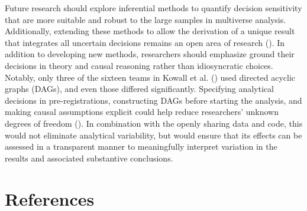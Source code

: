 \documentclass[
  man,
  floatsintext,
  longtable,
  nolmodern,
  notxfonts,
  notimes,
  colorlinks=true,linkcolor=blue,citecolor=blue,urlcolor=blue]{apa7}
\begin{document}
Future research should explore inferential methods to quantify decision
sensitivity that are more suitable and robust to the large samples in
multiverse analysis. Additionally, extending these methods to allow the
derivation of a unique result that integrates all uncertain decisions
remains an open area of research
(). In
addition to developing new methods, researchers should emphasize ground
their decisions in theory and causal reasoning rather than idiosyncratic
choices. Notably, only three of the sixteen teams in Kowall et al.
() used directed acyclic graphs
(DAGs), and even those differed significantly. Specifying analytical
decisions in pre-registrations, constructing DAGs before starting the
analysis, and making causal assumptions explicit could help reduce
researchers' unknown degrees of freedom
(). In combination with the openly sharing data and code, this would
not eliminate analytical variability, but would ensure that its effects
can be assessed in a transparent manner to meaningfully interpret
variation in the results and associated substantive conclusions.

\newpage

\section{References}\label{references}
\end{document}
